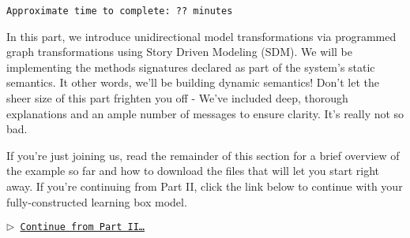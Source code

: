 \genHeader

{\scriptsize \texttt{Approximate time to complete: ?? minutes} }

In this part, we introduce unidirectional model transformations via programmed graph transformations using Story Driven Modeling (SDM). We will be implementing
the methods signatures declared as part of the system's static semantics. It other words, we'll be building dynamic semantics! Don't let the sheer
size of this part frighten you off - We've included deep, thorough explanations and an ample number of messages to ensure clarity. It's really not so bad.

If you're just joining us, read the remainder of this section for a brief overview of the example so far and how to download the files that will let you start right away. 
If you're continuing from Part II, click the link below to continue with your fully-constructed learning box model.

\begin{center}\texttt{$\triangleright$ \hyperlink{explanation}{Continue from Part II\ldots}}\end{center}




